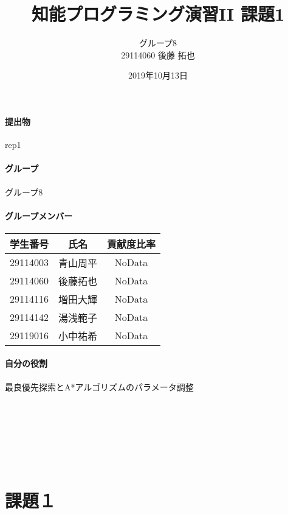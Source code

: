 \documentclass[uplatex,12pt]{jsarticle}
\title{知能プログラミング演習II 課題1}
\author{グループ8\\
  29114060 後藤 拓也\\
}
\date{2019年10月13日}
\begin{document}
\maketitle

\paragraph{提出物} rep1

\paragraph{グループ} グループ8

\paragraph{グループメンバー}
\begin{center}
\begin{tabular}{|c|c|c|}
  \hline
  学生番号&氏名&貢献度比率\\
  \hline\hline
  29114003&青山周平&NoData\\
  \hline
  29114060&後藤拓也&NoData\\
  \hline
  29114116&増田大輝&NoData\\
  \hline
  29114142&湯浅範子&NoData\\
  \hline
  29119016&小中祐希&NoData\\
  \hline
\end{tabular}
\end{center}
\paragraph{自分の役割} 最良優先探索とA*アルゴリズムのパラメータ調整
\\\\\\\\\\\\\\
\section{課題１}
\end{document}
